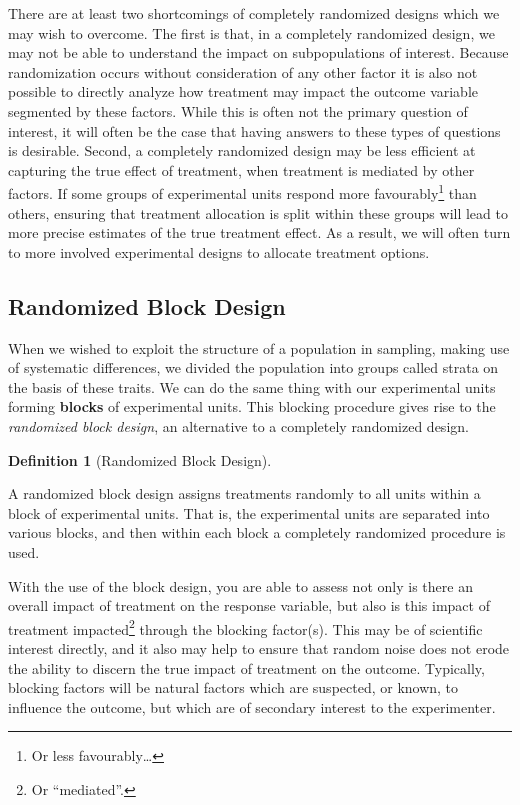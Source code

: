 \documentclass[
  letterpaper,
  DIV=11,
  numbers=noendperiod]{scrreprt}
\theoremstyle{definition}
\theoremstyle{definition}
\theoremstyle{definition}
\newtheorem{definition}{Definition}[chapter]
\theoremstyle{remark}
\begin{document}
There are at least two shortcomings of completely randomized designs
which we may wish to overcome. The first is that, in a completely
randomized design, we may not be able to understand the impact on
subpopulations of interest. Because randomization occurs without
consideration of any other factor it is also not possible to directly
analyze how treatment may impact the outcome variable segmented by these
factors. While this is often not the primary question of interest, it
will often be the case that having answers to these types of questions
is desirable. Second, a completely randomized design may be less
efficient at capturing the true effect of treatment, when treatment is
mediated by other factors. If some groups of experimental units respond
more favourably\footnote{Or less favourably\ldots{}} than others,
ensuring that treatment allocation is split within these groups will
lead to more precise estimates of the true treatment effect. As a
result, we will often turn to more involved experimental designs to
allocate treatment options.

\subsection{Randomized Block Design}\label{randomized-block-design}

When we wished to exploit the structure of a population in sampling,
making use of systematic differences, we divided the population into
groups called strata on the basis of these traits. We can do the same
thing with our experimental units forming \textbf{blocks} of
experimental units. This blocking procedure gives rise to the
\emph{randomized block design}, an alternative to a completely
randomized design.

\begin{definition}[Randomized Block
Design]\protect\hypertarget{def-randomized-block-design}{}\label{def-randomized-block-design}

A randomized block design assigns treatments randomly to all units
within a block of experimental units. That is, the experimental units
are separated into various blocks, and then within each block a
completely randomized procedure is used.

\end{definition}

With the use of the block design, you are able to assess not only is
there an overall impact of treatment on the response variable, but also
is this impact of treatment impacted\footnote{Or ``mediated''.} through
the blocking factor(s). This may be of scientific interest directly, and
it also may help to ensure that random noise does not erode the ability
to discern the true impact of treatment on the outcome. Typically,
blocking factors will be natural factors which are suspected, or known,
to influence the outcome, but which are of secondary interest to the
experimenter.
\end{document}
